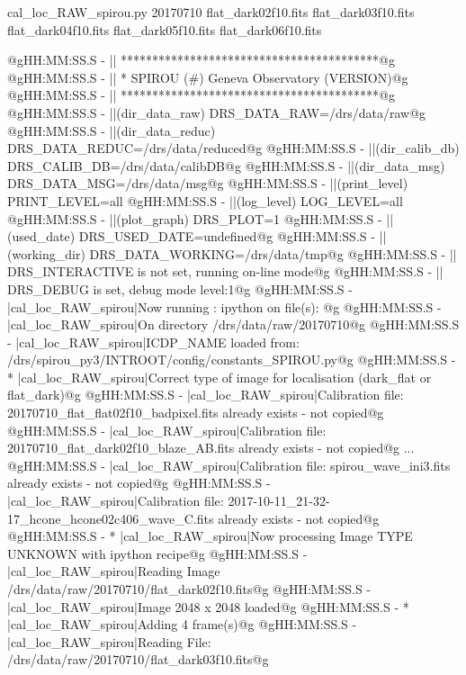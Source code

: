 \begin{cmdbox}[title={example}]
cal_loc_RAW_spirou.py 20170710 flat_dark02f10.fits flat_dark03f10.fits flat_dark04f10.fits flat_dark05f10.fits flat_dark06f10.fits
\end{cmdbox}
\begin{cmdboxprintspecial}[fontupper=\tiny, fontlower=\tiny]
@gHH:MM:SS.S -   || *****************************************@g
@gHH:MM:SS.S -   || * SPIROU \@(#) Geneva Observatory (VERSION)@g
@gHH:MM:SS.S -   || *****************************************@g
@gHH:MM:SS.S -   ||(dir_data_raw)      DRS_DATA_RAW=/drs/data/raw@g
@gHH:MM:SS.S -   ||(dir_data_reduc)    DRS_DATA_REDUC=/drs/data/reduced@g
@gHH:MM:SS.S -   ||(dir_calib_db)      DRS_CALIB_DB=/drs/data/calibDB@g
@gHH:MM:SS.S -   ||(dir_data_msg)      DRS_DATA_MSG=/drs/data/msg@g
@gHH:MM:SS.S -   ||(print_level)       PRINT_LEVEL=all         %
@gHH:MM:SS.S -   ||(log_level)         LOG_LEVEL=all         %
@gHH:MM:SS.S -   ||(plot_graph)        DRS_PLOT=1            %
@gHH:MM:SS.S -   ||(used_date)         DRS_USED_DATE=undefined@g
@gHH:MM:SS.S -   ||(working_dir)       DRS_DATA_WORKING=/drs/data/tmp@g
@gHH:MM:SS.S -   ||                    DRS_INTERACTIVE is not set, running on-line mode@g
@gHH:MM:SS.S -   ||                    DRS_DEBUG is set, debug mode level:1@g
@gHH:MM:SS.S -   |cal_loc_RAW_spirou|Now running : ipython on file(s): @g
@gHH:MM:SS.S -   |cal_loc_RAW_spirou|On directory /drs/data/raw/20170710@g
@gHH:MM:SS.S -   |cal_loc_RAW_spirou|ICDP_NAME loaded from: /drs/spirou_py3/INTROOT/config/constants_SPIROU.py@g
@gHH:MM:SS.S - * |cal_loc_RAW_spirou|Correct type of image for localisation (dark_flat or flat_dark)@g
@gHH:MM:SS.S -   |cal_loc_RAW_spirou|Calibration file: 20170710_flat_flat02f10_badpixel.fits already exists - not copied@g
@gHH:MM:SS.S -   |cal_loc_RAW_spirou|Calibration file: 20170710_flat_dark02f10_blaze_AB.fits already exists - not copied@g
...
@gHH:MM:SS.S -   |cal_loc_RAW_spirou|Calibration file: spirou_wave_ini3.fits already exists - not copied@g
@gHH:MM:SS.S -   |cal_loc_RAW_spirou|Calibration file: 2017-10-11_21-32-17_hcone_hcone02c406_wave_C.fits already exists - not copied@g
@gHH:MM:SS.S - * |cal_loc_RAW_spirou|Now processing Image TYPE UNKNOWN with ipython recipe@g
@gHH:MM:SS.S -   |cal_loc_RAW_spirou|Reading Image /drs/data/raw/20170710/flat_dark02f10.fits@g
@gHH:MM:SS.S -   |cal_loc_RAW_spirou|Image 2048 x 2048 loaded@g
@gHH:MM:SS.S - * |cal_loc_RAW_spirou|Adding 4 frame(s)@g
@gHH:MM:SS.S -   |cal_loc_RAW_spirou|Reading File: /drs/data/raw/20170710/flat_dark03f10.fits@g

\end{cmdboxprintspecial}
